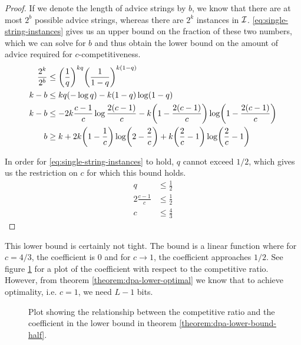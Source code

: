 \begin{proof}
    If we denote the length of advice strings by $b$, we know that there
    are at most $2^b$ possible advice strings, whereas there are $2^k$
    instances in $\mathcal{I}$. \eqref{eq:single-string-instances} gives us an
    upper bound on the fraction of these two numbers, which we can solve
    for $b$ and thus obtain the lower bound on the amount of advice
    required for $c$-competitiveness.
    \begin{align*}
        \frac{2^k}{2^b} &\leq \paren*{\frac{1}{q}}^{kq}
            \paren*{\frac{1}{1-q}}^{k(1-q)} \\
        k-b &\leq kq(-\log{}q) - k(1-q)\log(1-q) \\
        k-b &\leq -2k\frac{c-1}{c}\log\frac{2(c-1)}{c} -
            k\paren*{1-\frac{2(c-1)}{c}} \log\paren*{1-\frac{2(c-1)}{c}} \\
        b &\geq k + 2k\paren*{1-\frac{1}{c}}\log\paren*{2-\frac{2}{c}}
            + k\paren*{\frac{2}{c}-1}\log\paren*{\frac{2}{c}-1}
    \end{align*}

    In order for \eqref{eq:single-string-instances} to hold, $q$ cannot
    exceed $1/2$, which gives us the restriction on $c$ for which this
    bound holds.
    \begin{align*}
        q &\leq \frac{1}{2} \\
        2\frac{c-1}{c} &\leq \frac{1}{2} \\
        c &\leq \frac{4}{3}
    \end{align*}
\end{proof}

This lower bound is certainly not tight. The bound is a linear function
where for $c=4/3$, the coefficient is $0$ and for $c \to 1$, the
coefficient approaches $1/2$. See figure \ref{fig:dpa-lower-half-plot} for
a plot of the coefficient with respect to the competitive ratio. However,
from theorem \ref{theorem:dpa-lower-optimal} we know that to achieve
optimality, i.e. $c = 1$, we need $L-1$ bits.

\begin{figure}\centering
    \caption{Plot showing the relationship between the competitive ratio
    and the coefficient in the lower bound in theorem
    \ref{theorem:dpa-lower-bound-half}.}
    \label{fig:dpa-lower-half-plot}
\end{figure}

